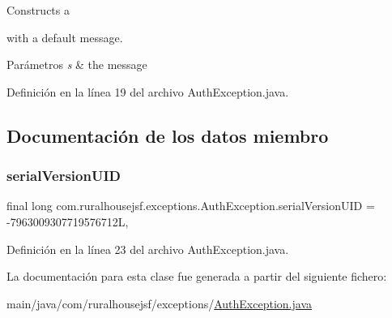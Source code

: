 Constructs a
\begin{DoxyCode}{0}
\end{DoxyCode}
 with a default message. 
\begin{DoxyParams}{Parámetros}
{\em s} & the message \\
\hline
\end{DoxyParams}


Definición en la línea 19 del archivo Auth\+Exception.\+java.



\subsection{Documentación de los datos miembro}
\mbox{\label{classcom_1_1ruralhousejsf_1_1exceptions_1_1_auth_exception_a0bda3b553296d4340933a563b323bb5f}} 
\subsubsection{\texorpdfstring{serialVersionUID}{serialVersionUID}}
{\footnotesize\ttfamily final long com.\+ruralhousejsf.\+exceptions.\+Auth\+Exception.\+serial\+Version\+U\+ID = -\/7963009307719576712L\hspace{0.3cm}{\ttfamily [static]}, {\ttfamily [private]}}



Definición en la línea 23 del archivo Auth\+Exception.\+java.



La documentación para esta clase fue generada a partir del siguiente fichero\+:\begin{DoxyCompactItemize}
\item 
main/java/com/ruralhousejsf/exceptions/\mbox{\hyperlink{_auth_exception_8java}{Auth\+Exception.\+java}}\end{DoxyCompactItemize}
